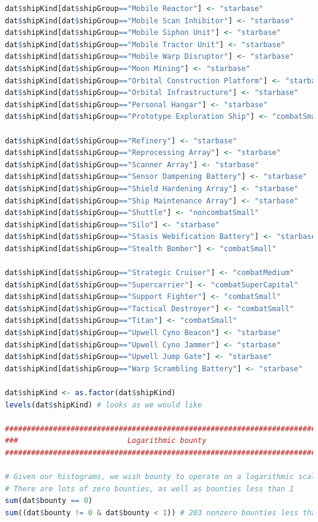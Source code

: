 \documentclass[letterpaper,12pt,article]{memoir}
\begin{document}
{\begin{lstlisting}[language=R]
dat$shipKind[dat$shipGroup=="Mobile Reactor"] <- "starbase"
dat$shipKind[dat$shipGroup=="Mobile Scan Inhibitor"] <- "starbase"
dat$shipKind[dat$shipGroup=="Mobile Siphon Unit"] <- "starbase"
dat$shipKind[dat$shipGroup=="Mobile Tractor Unit"] <- "starbase"
dat$shipKind[dat$shipGroup=="Mobile Warp Disruptor"] <- "starbase"
dat$shipKind[dat$shipGroup=="Moon Mining"] <- "starbase"
dat$shipKind[dat$shipGroup=="Orbital Construction Platform"] <- "starbase"
dat$shipKind[dat$shipGroup=="Orbital Infrastructure"] <- "starbase"
dat$shipKind[dat$shipGroup=="Personal Hangar"] <- "starbase"
dat$shipKind[dat$shipGroup=="Prototype Exploration Ship"] <- "combatSmall" 

dat$shipKind[dat$shipGroup=="Refinery"] <- "starbase"
dat$shipKind[dat$shipGroup=="Reprocessing Array"] <- "starbase"
dat$shipKind[dat$shipGroup=="Scanner Array"] <- "starbase"
dat$shipKind[dat$shipGroup=="Sensor Dampening Battery"] <- "starbase"
dat$shipKind[dat$shipGroup=="Shield Hardening Array"] <- "starbase"
dat$shipKind[dat$shipGroup=="Ship Maintenance Array"] <- "starbase"
dat$shipKind[dat$shipGroup=="Shuttle"] <- "noncombatSmall"
dat$shipKind[dat$shipGroup=="Silo"] <- "starbase"
dat$shipKind[dat$shipGroup=="Stasis Webification Battery"] <- "starbase"
dat$shipKind[dat$shipGroup=="Stealth Bomber"] <- "combatSmall"

dat$shipKind[dat$shipGroup=="Strategic Cruiser"] <- "combatMedium"
dat$shipKind[dat$shipGroup=="Supercarrier"] <- "combatSuperCapital"
dat$shipKind[dat$shipGroup=="Support Fighter"] <- "combatSmall"
dat$shipKind[dat$shipGroup=="Tactical Destroyer"] <- "combatSmall"
dat$shipKind[dat$shipGroup=="Titan"] <- "combatSmall"
dat$shipKind[dat$shipGroup=="Upwell Cyno Beacon"] <- "starbase"
dat$shipKind[dat$shipGroup=="Upwell Cyno Jammer"] <- "starbase"
dat$shipKind[dat$shipGroup=="Upwell Jump Gate"] <- "starbase"
dat$shipKind[dat$shipGroup=="Warp Scrambling Battery"] <- "starbase"

dat$shipKind <- as.factor(dat$shipKind)
levels(dat$shipKind) # looks as we would like

###############################################################################
###                         Logarithmic bounty                              ###
###############################################################################

# Given our histograms, we wish bounty to operate on a logarithmic scale also
# There are lots of zero bounties, as well as bounties less than 1
sum(dat$bounty == 0)
sum((dat$bounty != 0 & dat$bounty < 1)) # 203 nonzero bounties less than 1


\end{lstlisting}}
\end{document}
